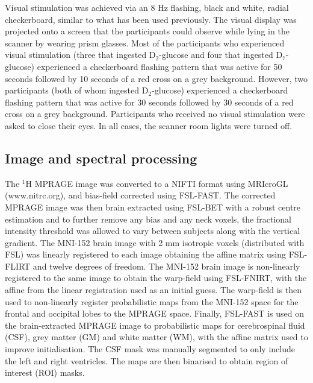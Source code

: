 \documentclass[class=article, crop=false]{standalone}
\begin{document}
Visual stimulation was achieved via an 8 Hz flashing, black and white, radial checkerboard, similar to what has been used previously\cite{Fernandes2020MeasurementT}. The visual display was projected onto a screen that the participants could observe while lying in the scanner by wearing prism glasses. Most of the participants who experienced visual stimulation (three that ingested D$_2$-glucose and four that ingested D$_7$-glucose) experienced a checkerboard flashing pattern that was active for 50 seconds followed by 10 seconds of a red cross on a grey background. However, two participants (both of whom ingested D$_2$-glucose) experienced a checkerboard flashing pattern that was active for 30 seconds followed by 30 seconds of a red cross on a grey background. Participants who received no visual stimulation were asked to close their eyes. In all cases, the scanner room lights were turned off. 

\subsection{Image and spectral processing}

The $^1$H MPRAGE image was converted to a NIFTI format using MRIcroGL (www.nitrc.org), and bias-field corrected using FSL-FAST\cite{Zhang2001SegmentationAlgorithm}. The corrected MPRAGE image was then brain extracted using FSL-BET\cite{Smith2002FastExtraction} with a robust centre estimation and to further remove any bias and any neck voxels, the fractional intensity threshold was allowed to vary between subjects along with the vertical gradient. The MNI-152 brain image with 2 mm isotropic voxels (distributed with FSL\cite{Smith2004AdvancesFSL}) was linearly registered to each image obtaining the affine matrix using FSL-FLIRT\cite{Jenkinson2001AImages, Jenkinson2002ImprovedImages} and twelve degrees of freedom. The MNI-152 brain image is non-linearly registered to the same image to obtain the warp-field using FSL-FNIRT\cite{AnderssonJ2008FNIRT-FMRIBsTool}, with the affine from the linear registration used as an initial guess. The warp-field is then used to non-linearly register probabilistic maps from the MNI-152 space for the frontal and occipital lobes to the MPRAGE space. Finally, FSL-FAST\cite{Zhang2001SegmentationAlgorithm} is used on the brain-extracted MPRAGE image to probabilistic maps for cerebrospinal fluid (CSF), grey matter (GM) and white matter (WM), with the affine matrix used to improve initialisation. The CSF mask was manually segmented to only include the left and right ventricles. The maps are then binarised to obtain region of interest (ROI) masks. 
\end{document}
